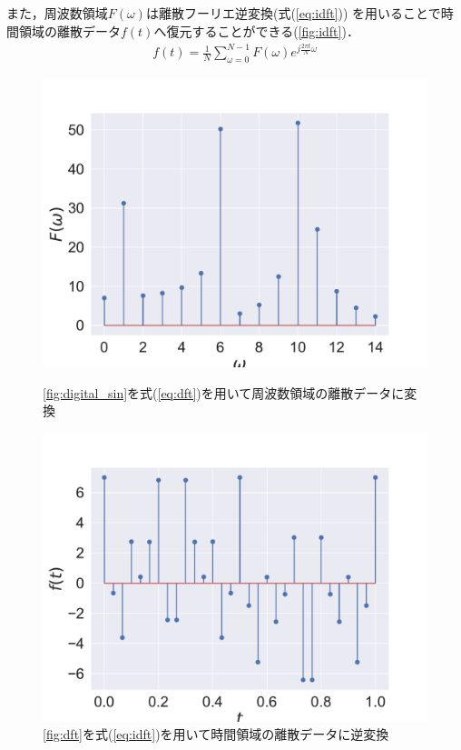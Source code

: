 また，周波数領域$F(\omega)$は離散フーリエ逆変換(式(\ref{eq:idft}))
を用いることで時間領域の離散データ$f(t)$へ復元することができる(\autoref{fig:idft})．
\begin{align}
  f(t) = \frac{1}{N}\sum_{\omega=0}^{N-1} F(\omega) e ^ {j \frac{2 \pi t}{N} \omega} \label{eq:idft}
\end{align}
\iffigure
\begin{figure}[h]
  \centering
  \begin{minipage}{.45\hsize}
    \includegraphics[clip, width=\textwidth]{figure/sin_dft.pdf}
    \caption{\autoref{fig:digital_sin}を式(\ref{eq:dft})を用いて周波数領域の離散データに変換}
    \label{fig:dft}
  \end{minipage}
  \begin{minipage}{.45\hsize}
    \includegraphics[clip, width=\textwidth]{figure/sin_idft.pdf}
    \caption{\autoref{fig:dft}を式(\ref{eq:idft})を用いて時間領域の離散データに逆変換}
    \label{fig:idft}
  \end{minipage}
\end{figure}
\fi
